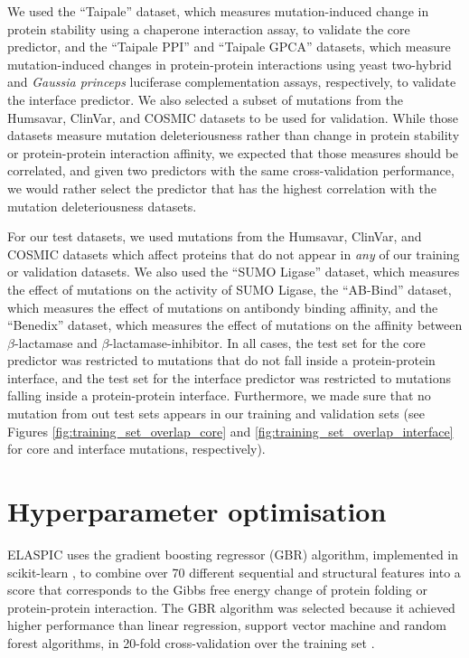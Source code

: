We used the ``Taipale'' dataset, which measures mutation-induced change in protein stability using a chaperone interaction assay, to validate the core predictor, and the ``Taipale PPI'' and ``Taipale GPCA'' datasets, which measure mutation-induced changes in protein-protein interactions using yeast two-hybrid and \textit{Gaussia princeps} luciferase complementation assays, respectively, to validate the interface predictor. We also selected a subset of mutations from the Humsavar, ClinVar, and COSMIC datasets to be used for validation. While those datasets measure mutation deleteriousness rather than change in protein stability or protein-protein interaction affinity, we expected that those measures should be correlated, and given two predictors with the same cross-validation performance, we would rather select the predictor that has the highest correlation with the mutation deleteriousness datasets.

For our test datasets, we used mutations from the Humsavar, ClinVar, and COSMIC datasets which affect proteins that do not appear in \textit{any} of our training or validation datasets. We also used the ``SUMO Ligase'' dataset, which measures the effect of mutations on the activity of SUMO Ligase, the ``AB-Bind'' dataset, which measures the effect of mutations on antibondy binding affinity, and the ``Benedix'' dataset, which measures the effect of mutations on the affinity between $\beta$-lactamase and $\beta$-lactamase-inhibitor. In all cases, the test set for the core predictor was restricted to mutations that do not fall inside a protein-protein interface, and the test set for the interface predictor was restricted to mutations falling inside a protein-protein interface. Furthermore, we made sure that no mutation from out test sets appears in our training and validation sets (see Figures \ref{fig:training_set_overlap_core} and \ref{fig:training_set_overlap_interface} for core and interface mutations, respectively).




\clearpage
\section{Hyperparameter optimisation} \label{sec:gridsearch}

ELASPIC uses the gradient boosting regressor (GBR) algorithm, implemented in scikit-learn \cite{scikit-learn}, to  combine over 70 different sequential and structural features into a score that corresponds to the Gibbs free energy change of protein folding or protein-protein interaction. The GBR algorithm was selected because it achieved higher performance than linear regression, support vector machine and random forest algorithms, in 20-fold cross-validation over the training set \cite{berliner_combining_2014}.

